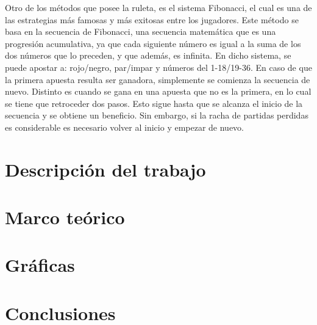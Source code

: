 \documentclass{article}
\begin{document}
    Otro de los métodos que posee la ruleta, es el sistema Fibonacci, el cual es una de las estrategias
    más famosas y más exitosas entre los jugadores. Este método se basa en la secuencia de Fibonacci,
    una secuencia matemática que es una progresión acumulativa,
    ya que cada siguiente número es igual a la suma de los dos números que lo preceden, y que además,
    es infinita. En dicho sistema, se puede apostar a: rojo/negro, par/impar y números del 1-18/19-36.
    En caso de que la primera apuesta resulta ser ganadora, simplemente se comienza la secuencia de nuevo.
    Distinto es cuando se gana en una apuesta que no es la primera, en lo cual se tiene que retroceder dos pasos.
    Esto sigue hasta que se alcanza el inicio de la secuencia y se obtiene un beneficio.
    Sin embargo, si la racha de partidas perdidas es considerable es necesario volver al inicio y
    empezar de nuevo.








    \section{Descripción del trabajo}
    \label{sec:headings}



    \section{Marco teórico}


    \section{Gráficas}




    \section{Conclusiones}
\end{document}
